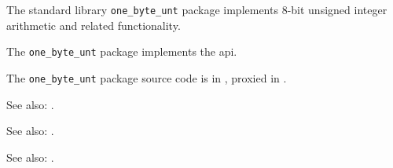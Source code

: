 
The standard library {\tt one\_byte\_unt} package implements 8-bit unsigned integer arithmetic and related 
functionality.

The {\tt one\_byte\_unt} package implements the  api.

The {\tt one\_byte\_unt} package source code is in , 
proxied in .

See also: .

See also: .

See also: .
